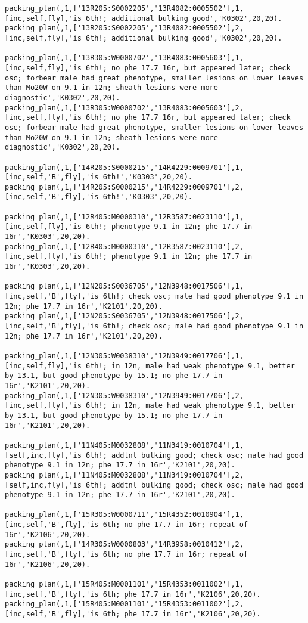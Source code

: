 \documentclass[11pt]{article}
\begin{document}
\begin{verbatim}
packing_plan(,1,['13R205:S0002205','13R4082:0005502'],1,[inc,self,fly],'is 6th!; additional bulking good','K0302',20,20).
packing_plan(,1,['13R205:S0002205','13R4082:0005502'],2,[inc,self,fly],'is 6th!; additional bulking good','K0302',20,20).

packing_plan(,1,['13R305:W0000702','13R4083:0005603'],1,[inc,self,fly],'is 6th!; no phe 17.7 16r, but appeared later; check osc; forbear male had great phenotype, smaller lesions on lower leaves than Mo20W on 9.1 in 12n; sheath lesions were more diagnostic','K0302',20,20).
packing_plan(,1,['13R305:W0000702','13R4083:0005603'],2,[inc,self,fly],'is 6th!; no phe 17.7 16r, but appeared later; check osc; forbear male had great phenotype, smaller lesions on lower leaves than Mo20W on 9.1 in 12n; sheath lesions were more diagnostic','K0302',20,20).

packing_plan(,1,['14R205:S0000215','14R4229:0009701'],1,[inc,self,'B',fly],'is 6th!','K0303',20,20).
packing_plan(,1,['14R205:S0000215','14R4229:0009701'],2,[inc,self,'B',fly],'is 6th!','K0303',20,20).

packing_plan(,1,['12R405:M0000310','12R3587:0023110'],1,[inc,self,fly],'is 6th!; phenotype 9.1 in 12n; phe 17.7 in 16r','K0303',20,20).
packing_plan(,1,['12R405:M0000310','12R3587:0023110'],2,[inc,self,fly],'is 6th!; phenotype 9.1 in 12n; phe 17.7 in 16r','K0303',20,20).

packing_plan(,1,['12N205:S0036705','12N3948:0017506'],1,[inc,self,'B',fly],'is 6th!; check osc; male had good phenotype 9.1 in 12n; phe 17.7 in 16r','K2101',20,20).
packing_plan(,1,['12N205:S0036705','12N3948:0017506'],2,[inc,self,'B',fly],'is 6th!; check osc; male had good phenotype 9.1 in 12n; phe 17.7 in 16r','K2101',20,20).

packing_plan(,1,['12N305:W0038310','12N3949:0017706'],1,[inc,self,fly],'is 6th!; in 12n, male had weak phenotype 9.1, better by 13.1, but good phenotype by 15.1; no phe 17.7 in 16r','K2101',20,20).
packing_plan(,1,['12N305:W0038310','12N3949:0017706'],2,[inc,self,fly],'is 6th!; in 12n, male had weak phenotype 9.1, better by 13.1, but good phenotype by 15.1; no phe 17.7 in 16r','K2101',20,20).

packing_plan(,1,['11N405:M0032808','11N3419:0010704'],1,[self,inc,fly],'is 6th!; addtnl bulking good; check osc; male had good phenotype 9.1 in 12n; phe 17.7 in 16r','K2101',20,20).
packing_plan(,1,['11N405:M0032808','11N3419:0010704'],2,[self,inc,fly],'is 6th!; addtnl bulking good; check osc; male had good phenotype 9.1 in 12n; phe 17.7 in 16r','K2101',20,20).

packing_plan(,1,['15R305:W0000711','15R4352:0010904'],1,[inc,self,'B',fly],'is 6th; no phe 17.7 in 16r; repeat of 16r','K2106',20,20).
packing_plan(,1,['14R305:W0000803','14R3958:0010412'],2,[inc,self,'B',fly],'is 6th; no phe 17.7 in 16r; repeat of 16r','K2106',20,20).

packing_plan(,1,['15R405:M0001101','15R4353:0011002'],1,[inc,self,'B',fly],'is 6th; phe 17.7 in 16r','K2106',20,20).
packing_plan(,1,['15R405:M0001101','15R4353:0011002'],2,[inc,self,'B',fly],'is 6th; phe 17.7 in 16r','K2106',20,20).
\end{verbatim}
\end{document}
